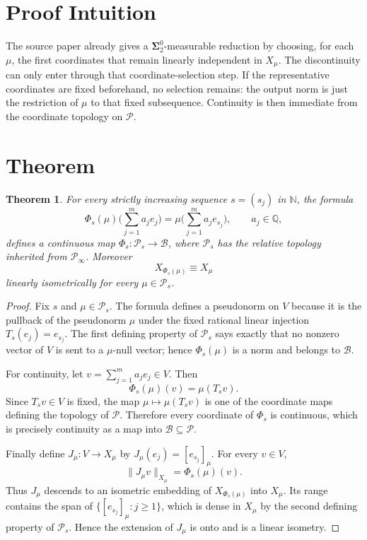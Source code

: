 \documentclass[11pt]{article}
\newtheorem{theorem}{Theorem}
\newcommand{\PP}{\mathcal P}
\newcommand{\BB}{\mathcal B}
\newcommand{\Nat}{\mathbb N}
\newcommand{\Rat}{\mathbb Q}
\begin{document}
\section*{Proof Intuition}

The source paper already gives a \(\boldsymbol{\Sigma}^0_2\)-measurable
reduction by choosing, for each \(\mu\), the first coordinates that remain
linearly independent in \(X_\mu\). The discontinuity can only enter through
that coordinate-selection step. If the representative coordinates are fixed
beforehand, no selection remains: the output norm is just the restriction of
\(\mu\) to that fixed subsequence. Continuity is then immediate from the
coordinate topology on \(\PP\).

\section*{Theorem}

\begin{theorem}
For every strictly increasing sequence \(s=(s_j)\) in \(\Nat\), the formula
\[
\Phi_s(\mu)\Big(\sum_{j=1}^m a_j e_j\Big)
 =
\mu\Big(\sum_{j=1}^m a_j e_{s_j}\Big),
\qquad a_j\in\Rat,
\]
defines a continuous map \(\Phi_s:\PP_s\to\BB\), where \(\PP_s\) has the
relative topology inherited from \(\PP_\infty\). Moreover
\[
X_{\Phi_s(\mu)}\equiv X_\mu
\]
linearly isometrically for every \(\mu\in\PP_s\).
\end{theorem}

\begin{proof}
Fix \(s\) and \(\mu\in\PP_s\). The formula defines a pseudonorm on \(V\)
because it is the pullback of the pseudonorm \(\mu\) under the fixed rational
linear injection \(T_s(e_j)=e_{s_j}\). The first defining property of
\(\PP_s\) says exactly that no nonzero vector of \(V\) is sent to a
\(\mu\)-null vector; hence \(\Phi_s(\mu)\) is a norm and belongs to \(\BB\).

For continuity, let \(v=\sum_{j=1}^m a_j e_j\in V\). Then
\[
\Phi_s(\mu)(v)=\mu(T_s v).
\]
Since \(T_s v\in V\) is fixed, the map \(\mu\mapsto \mu(T_s v)\) is one of
the coordinate maps defining the topology of \(\PP\). Therefore every
coordinate of \(\Phi_s\) is continuous, which is precisely continuity as a map
into \(\BB\subseteq\PP\).

Finally define \(J_\mu:V\to X_\mu\) by \(J_\mu(e_j)=[e_{s_j}]_\mu\). For
every \(v\in V\),
\[
\|J_\mu v\|_{X_\mu}=\Phi_s(\mu)(v).
\]
Thus \(J_\mu\) descends to an isometric embedding of \(X_{\Phi_s(\mu)}\) into
\(X_\mu\). Its range contains the span of \(\{[e_{s_j}]_\mu:j\ge1\}\), which
is dense in \(X_\mu\) by the second defining property of \(\PP_s\). Hence the
extension of \(J_\mu\) is onto and is a linear isometry.
\end{proof}
\end{document}
